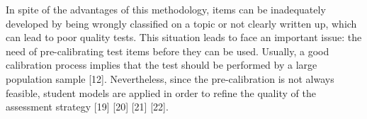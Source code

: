 In spite of the advantages of this methodology, items can be inadequately developed by being wrongly classified on a topic or not clearly written up, which can lead to poor quality tests. This situation leads to face an important issue: the need of pre-calibrating test items before they can be used. Usually, a good calibration process implies that the test should be performed by a large population sample [12]. Nevertheless, since the pre-calibration is not always feasible, student models are applied in order to refine the quality of the assessment strategy [19] [20] [21] [22].